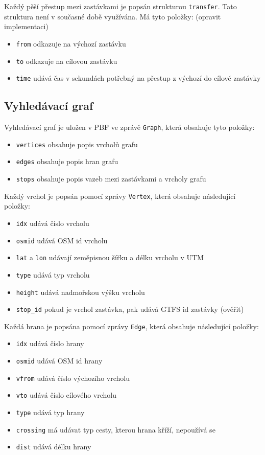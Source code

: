 Každý pěší přestup mezi zastávkami je popsán strukturou {\tt transfer}. Tato
struktura není v současné době využívána. Má tyto položky: (\TODO opravit
implementaci)
\begin{itemize}
	\item {\tt from} odkazuje na výchozí zastávku
	\item {\tt to} odkazuje na cílovou zastávku
	\item {\tt time} udává čas v sekundách potřebný na přestup z výchozí do
	cílové zastávky
\end{itemize}
\subsection{Vyhledávací graf}
Vyhledávací graf je uložen v PBF ve zprávě {\tt Graph}, která obsahuje tyto
položky:
\begin{itemize}
	\item {\tt vertices} obsahuje popis vrcholů grafu
	\item {\tt edges} obsahuje popis hran grafu
	\item {\tt stops} obsahuje popis vazeb mezi zastávkami a vrcholy grafu 
\end{itemize} 
Každý vrchol je popsán pomocí zprávy {\tt Vertex}, která obsahuje následující
položky:
\begin{itemize}
	\item {\tt idx} udává číslo vrcholu
	\item {\tt osmid} udává OSM id vrcholu
	\item {\tt lat} a {\tt lon} udávají zeměpisnou šířku a délku vrcholu v
	UTM
	\item {\tt type} udává typ vrcholu
	\item {\tt height} udává nadmořskou výšku vrcholu
	\item {\tt stop\_id} pokud je vrchol zastávka, pak udává GTFS id
	zastávky (\TODO ověřit) 
\end{itemize} 
Každá hrana je popsána pomocí zprávy {\tt Edge}, která obsahuje následující
položky: 
\begin{itemize}
	\item {\tt idx} udává číslo hrany
	\item {\tt osmid} udává OSM id hrany
	\item {\tt vfrom} udává číslo výchozího vrcholu 
	\item {\tt vto} udává číslo cílového vrcholu
	\item {\tt type} udává typ hrany
	\item {\tt crossing} má udávat typ cesty, kterou hrana kříží, nepoužívá
	se
	\item {\tt dist} udává délku hrany
\end{itemize} 
